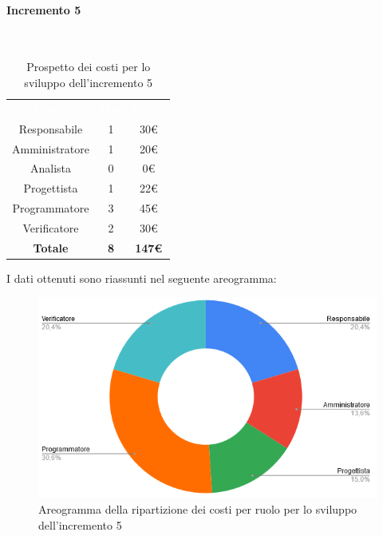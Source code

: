 \paragraph*{Incremento 5}\mbox{} \\
\begin{table}[H]
\centering\renewcommand{\arraystretch}{1.5}
\caption{Prospetto dei costi per lo sviluppo dell'incremento 5}
\vspace{0.2cm}
\begin{tabular}{ c c c }
\rowcolor{redafk}
\textcolor{white}{\textbf{Ruolo}} & \textcolor{white}{\textbf{Ore}} &
\textcolor{white}{\textbf{Costo}}  \\
Responsabile & 1 & 30€ \\
Amministratore & 1 & 20€ \\
Analista & 0 & 0€ \\
Progettista & 1 & 22€ \\
Programmatore & 3 & 45€  \\
Verificatore & 2 & 30€  \\
\rowcolor{lastrowcolor}
\textbf{Totale} & \textbf{8} & \textbf{147€}  \\
\end{tabular}
\end{table}
 
I dati ottenuti sono riassunti nel seguente areogramma:
\begin{figure}[H]
\centering
\includegraphics[scale=0.60]{img/grafici/torta_inc5.png}
\caption{Areogramma della ripartizione dei costi per ruolo per lo sviluppo dell'incremento 5}
\end{figure}

